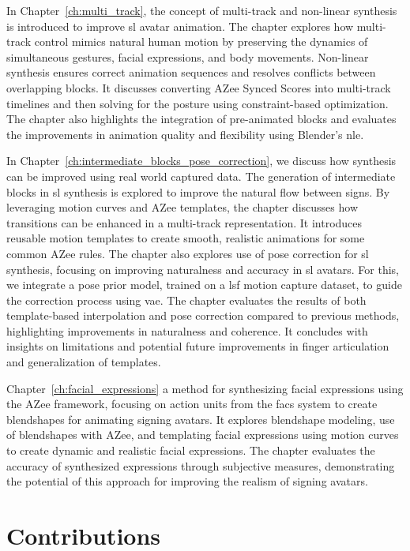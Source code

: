 \documentclass[../../main.tex]{subfiles}
\begin{document}
In Chapter~\ref{ch:multi_track}, the concept of multi-track and non-linear synthesis is introduced to improve \gls{sl} avatar animation. The chapter explores how multi-track control mimics natural human motion by preserving the dynamics of simultaneous gestures, facial expressions, and body movements. Non-linear synthesis ensures correct animation sequences and resolves conflicts between overlapping blocks. It discusses converting AZee Synced Scores into multi-track timelines and then solving for the posture using constraint-based  optimization. The chapter also highlights the integration of pre-animated blocks and evaluates the improvements in animation quality and flexibility using Blender's \gls{nle}.

In Chapter~\ref{ch:intermediate_blocks_pose_correction}, we discuss how synthesis can be improved using real world captured data. The generation of intermediate blocks in \gls{sl} synthesis is explored to improve the natural flow between signs. By leveraging motion curves and AZee templates, the chapter discusses how transitions can be enhanced in a multi-track representation. It introduces reusable motion templates to create smooth, realistic animations for some common AZee rules. The chapter also explores use of pose correction for \gls{sl} synthesis, focusing on improving naturalness and accuracy in \gls{sl} avatars. For this, we integrate a pose prior model, trained on a \gls{lsf} motion capture dataset, to guide the correction process using \gls{vae}. The chapter evaluates the results of both template-based interpolation and pose correction compared to previous methods, highlighting improvements in naturalness and coherence. It concludes with insights on limitations and potential future improvements in finger articulation and generalization of templates. 

Chapter~\ref{ch:facial_expressions} a method for synthesizing facial expressions using the AZee framework, focusing on action units from the \gls{facs} system to create blendshapes for animating signing avatars. It explores blendshape modeling, use of blendshapes with AZee, and templating facial expressions using motion curves to create dynamic and realistic facial expressions. The chapter evaluates the accuracy of synthesized expressions through subjective measures, demonstrating the potential of this approach for improving the realism of signing avatars.

\section{Contributions}
\label{ch:conclusion:contributions}
\end{document}
